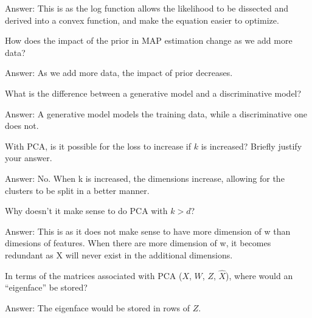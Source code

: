 \documentclass{article}
\def\ans#1{\par\gre{Answer: #1}}
\def\gre#1{{\color{gre}#1}}
\begin{document}
{\ans{This is as the log function allows the likelihood to be dissected and derived into a convex function, and make the equation easier to optimize.}
\item How does the impact of the prior in MAP estimation change as we add more data?
\ans{As we add more data, the impact of prior decreases.}
\item What is the difference between a generative model and a discriminative model?
\ans{A generative model models the training data, while a discriminative one does not.}
\item With PCA, is it possible for the loss to increase if $k$ is increased? Briefly justify your answer.
\ans{No. When k is increased, the dimensions increase, allowing for the clusters to be split in a better manner.}
\item Why doesn't it make sense to do PCA with $k > d$?
\ans{This is as it does not make sense to have more dimension of w than dimesions of features. When there are more dimension of w, it becomes redundant as X will never exist in the additional dimensions.}
\item In terms of the matrices associated with PCA ($X$, $W$, $Z$, $\hat{X}$), where would an ``eigenface'' be stored?
\ans{The eigenface would be stored in rows of $Z$.}
}
\end{document}

